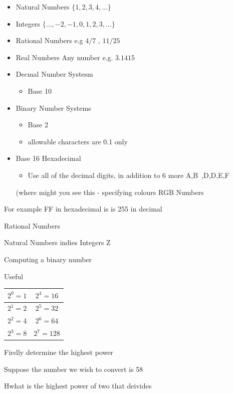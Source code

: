 \documentclass[]{report}
\begin{document}

\begin{itemize}
\item Natural Numbers $\{1,2,3,4, \ldots\}$
\item Integers $\{\ldots,-2,-1,0,1,2,3,\ldots\}$
\item Rational Numbers e.g $4/7$ , $11/25$
\item Real Numbers Any number e.g. $3.1415$
\end{itemize}




\begin{itemize}
\item Decmal Number Systesm
\begin{itemize}
\item Base 10
\end{itemize}

\item Binary Number Systems
\begin{itemize}
\item Base 2
\item allowable characters are {0.1} only
\end{itemize}
\item Base 16 Hexadecimal
\begin{itemize}
\item Use all of the decimal digits, in addition to 6 more A,B~,D,D,E,F
\end{itemize}
(where might you see this  - specifying colours RGB Numbers
\end{itemize}

For example FF in hexadecimal is is 255 in decimal 


Rational Numbers

Natural Numbers indies
Integers Z



Computing a binary number

Useful
{
\begin{center}
\begin{tabular}{|c|c|}
\hline $2^0 = 1 $ & $2^4 = 16  $ \\ 
\hline $2^1 = 2 $ & $2^5 = 32$ \\ 
\hline $2^2 = 4 $ & $2^6 = 64$ \\ 
\hline $2^3 = 8 $ & $ 2^7 = 128$ \\ 
\hline 
\end{tabular} 
\end{center}
}


\newpage




Firslly determine the highest power

Suppose the number we wish to convert is 58

Hwhat is the highest power of two that deivides
\end{document}
